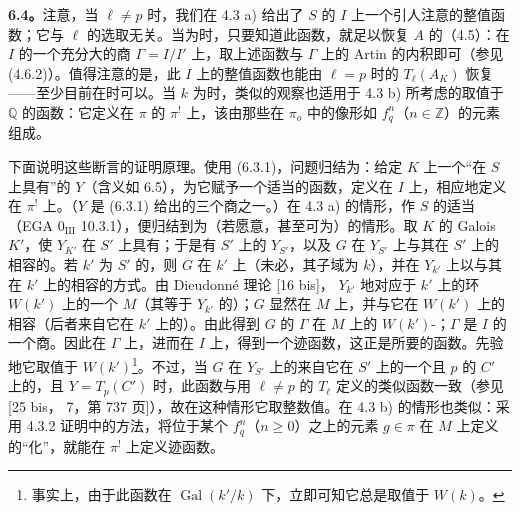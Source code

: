 \textbf{6.4。}注意，当 $\ell\ne p$ 时，我们在 4.3 a) 给出了 $S$ 的 $I$ 上一个引人注意的整值函数；它与 $\ell$ 的选取无关。当为时，只要知道此函数，就足以恢复 $A$ 的（4.5）：在 $I$ 的一个充分大的商 $\Gamma=I/I'$ 上，取上述函数与 $\Gamma$ 上的 Artin 的内积即可（参见 (4.6.2)）。值得注意的是，此 $I$ 上的整值函数也能由 $\ell=p$ 时的 $T_\ell(A_K)$ 恢复——至少目前在时可以。当 $k$ 为时，类似的观察也适用于 4.3 b) 所考虑的取值于 $\mathbb Q$ 的函数：它定义在 $\pi$ 的 $\pi^!$ 上，该由那些在 $\pi_o$ 中的像形如 $f_q^n$（$n\in\mathbb Z$）的元素组成。

下面说明这些断言的证明原理。使用 (6.3.1)，问题归结为：给定 $K$ 上一个“在 $S$ 上具有”的  $Y$（含义如 6.5），为它赋予一个适当的函数，定义在 $I$ 上，相应地定义在 $\pi^!$ 上。（$Y$ 是 (6.3.1) 给出的三个商之一。）在 4.3 a) 的情形，作 $S$ 的适当（EGA $0_{\mathrm{III}}$ 10.3.1），便归结到为（若愿意，甚至可为）的情形。取 $K$ 的 Galois  $K'$，使 $Y_{K'}$ 在 $S'$ 上具有；于是有 $S'$ 上的  $Y_{S'}$，以及 $G$ 在 $Y_{S'}$ 上与其在 $S'$ 上的相容的。若 $k'$ 为 $S'$ 的，则 $G$
在 $k'$ 上（未必，其子域为 $k$），并在 $Y_{k'}$ 上以与其在 $k'$ 上的相容的方式。由 Dieudonné 理论 [16 bis]， $Y_{k'}$ 地对应于 $k'$ 上的环 $W(k')$ 上的一个 $M$（其等于 $Y_{k'}$ 的）；$G$ 显然在 $M$ 上，并与它在 $W(k')$ 上的相容（后者来自它在 $k'$ 上的）。由此得到 $G$ 的 $\Gamma$ 在 $M$ 上的 $W(k')$-；$\Gamma$ 是 $I$ 的一个商。因此在 $\Gamma$ 上，进而在 $I$ 上，得到一个迹函数，这正是所要的函数。先验地它取值于 $W(k')$\footnote{事实上，由于此函数在 $\operatorname{Gal}(k'/k)$ 下，立即可知它总是取值于 $W(k)$。}。不过，当 $G$ 在 $Y_{S'}$ 上的来自它在 $S'$ 上的一个且 $p$ 的 $C'$ 上的，且 $Y=T_p(C')$ 时，此函数与用 $\ell\ne p$ 的 $T_\ell$ 定义的类似函数一致（参见 [25 bis， 7，第 737 页]），故在这种情形它取整数值。在 4.3 b) 的情形也类似：采用 4.3.2 证明中的方法，将位于某个 $f_q^n$（$n\ge0$）之上的元素 $g\in\pi$ 在 $M$ 上定义的“化”，就能在 $\pi^!$ 上定义迹函数。
